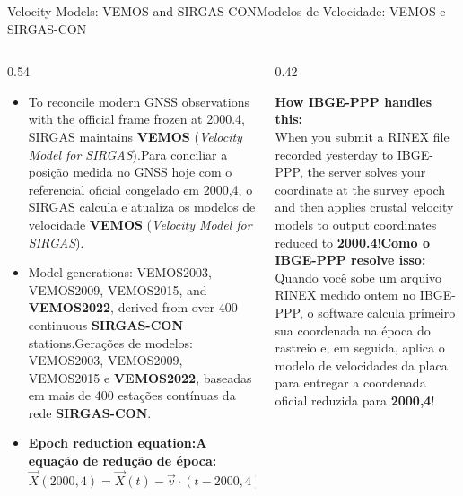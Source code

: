 \documentclass[aspectratio=169,11pt]{beamer}
\newcommand{\tr}[2]{\ifEN#2\else#1\fi}
\newcommand{\bnum}[1]{\ifmmode\textcolor{mTeal}{\mathbf{#1}}\else\textbf{\textcolor{mTeal}{#1}}\fi}
\begin{document}
\begin{frame}{\tr{Modelos de Velocidade: VEMOS e SIRGAS-CON}{Velocity Models: VEMOS and SIRGAS-CON}}
  \begin{columns}[onlytextwidth]
    \begin{column}{0.54\textwidth}
      \begin{itemize}
        \setlength{\itemsep}{4pt}
        \scriptsize
        \item \tr{Para conciliar a posição medida no GNSS hoje com o referencial oficial congelado em
              2000,4, o SIRGAS calcula e atualiza os modelos de velocidade \textbf{VEMOS} (\emph{Velocity
              Model for SIRGAS}).}{To reconcile modern GNSS observations with the official frame
              frozen at 2000.4, SIRGAS maintains \textbf{VEMOS} (\emph{Velocity Model for SIRGAS}).}
        \item \tr{Gerações de modelos: VEMOS2003, VEMOS2009, VEMOS2015 e \bnum{VEMOS2022}, baseadas em
              mais de \num{400} estações contínuas da rede \textbf{SIRGAS-CON}.}{Model generations:
              VEMOS2003, VEMOS2009, VEMOS2015, and \bnum{VEMOS2022}, derived from over \num{400}
              continuous \textbf{SIRGAS-CON} stations.}
        \item \tr{\textbf{A equação de redução de época:}}{\textbf{Epoch reduction equation:}}
              \begin{equation*}
                \vec{X}(2000{,}4) = \vec{X}(t) - \vec{v} \cdot (t - 2000{,}4)
              \end{equation*}
      \end{itemize}
    \end{column}
    \begin{column}{0.42\textwidth}
      \begin{regra}
        \scriptsize
        \tr{\textbf{Como o IBGE-PPP resolve isso:}\\[3pt]
        Quando você sobe um arquivo RINEX medido ontem no IBGE-PPP, o software calcula primeiro sua
        coordenada na época do rastreio e, em seguida, aplica o modelo de velocidades da placa para
        entregar a coordenada oficial reduzida para \bnum{2000,4}!}{\textbf{How IBGE-PPP handles this:}\\[3pt]
        When you submit a RINEX file recorded yesterday to IBGE-PPP, the server solves your coordinate
        at the survey epoch and then applies crustal velocity models to output coordinates reduced to
        \bnum{2000.4}!}
      \end{regra}
    \end{column}
  \end{columns}
\end{frame}
\end{document}
